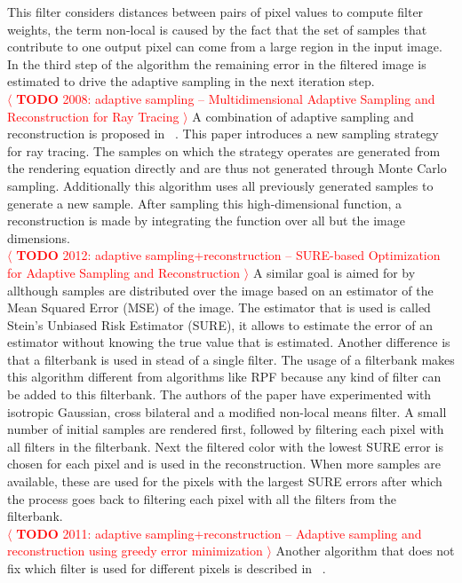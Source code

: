 \documentclass[review]{acmsiggraph}
\newcommand{\todo}[1]{\textcolor{red}{\(\langle\) \textbf{TODO} #1 \(\rangle\) }}
\begin{document}
This filter considers distances between pairs of pixel values to compute filter weights, the term non-local is caused by the fact that the set of samples that contribute to one output pixel can come from a large region in the input image.
In the third step of the algorithm the remaining error in the filtered image is estimated to drive the adaptive sampling in the next iteration step.
\\
\todo{2008: adaptive sampling -- Multidimensional Adaptive Sampling and Reconstruction for Ray Tracing}
A combination of adaptive sampling and reconstruction is proposed in ~\cite{Hachisuka:2008:MAS:1360612.1360632}.
This paper introduces a new sampling strategy for ray tracing.
The samples on which the strategy operates are generated from the rendering equation directly and are thus not generated through Monte Carlo sampling.
Additionally this algorithm uses all previously generated samples to generate a new sample.
After sampling this high-dimensional function, a reconstruction is made by integrating the function over all but the image dimensions.
\\
\todo{2012: adaptive sampling+reconstruction -- SURE-based Optimization for Adaptive Sampling and Reconstruction}
A similar goal is aimed for by ~\cite{Li:2012:SBO} allthough samples are distributed over the image based on an estimator of the Mean Squared Error (MSE) of the image.
The estimator that is used is called Stein's Unbiased Risk Estimator (SURE), it allows to estimate the error of an estimator without knowing the true value that is estimated.
Another difference is that a filterbank is used in stead of a single filter.
The usage of a filterbank makes this algorithm different from algorithms like RPF because any kind of filter can be added to this filterbank.
The authors of the paper have experimented with isotropic Gaussian, cross bilateral and a modified non-local means filter.
A small number of initial samples are rendered first, followed by filtering each pixel with all filters in the filterbank.
Next the filtered color with the lowest SURE error is chosen for each pixel and is used in the reconstruction.
When more samples are available, these are used for the pixels with the largest SURE errors after which the process goes back to filtering each pixel with all the filters from the filterbank.
\\
\todo{2011: adaptive sampling+reconstruction -- Adaptive sampling and reconstruction using greedy error minimization}
Another algorithm that does not fix which filter is used for different pixels is described in ~\cite{Rousselle:2011:ASR:2070781.2024193}.
\end{document}
